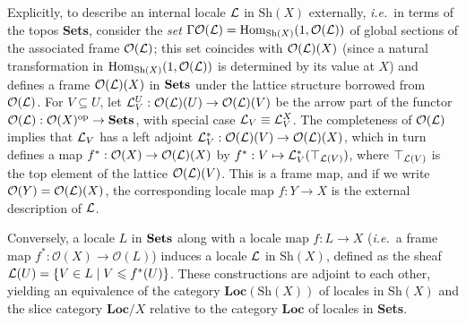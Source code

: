 \documentclass[12pt]{article}
\newcommand{\Sets}{\mbox{\textbf{Sets}}}
\newcommand{\raw}{\rightarrow} \newcommand{\rat}{\mapsto}
\newcommand{\CO}{{\mathcal O}} \newcommand{\CP}{{\mathcal P}}
\newcommand{\Sh}{\ensuremath{\mathrm{Sh}}}
\newcommand{\ie}{\textit{i.e.}}
\begin{document}
Explicitly,  to describe an internal locale ${\mathcal L}$ in $\Sh(X)$
externally, \ie\ in terms of the topos \Sets, consider the {\it set}
$\Gm\CO(\CL)=\mathrm{Hom}_{\Sh(X)}(1,\CO(\CL))$  of global sections of the
associated frame $\CO(\CL)$; this set coincides with $\CO(\CL)(X)$ 
(since a
natural transformation in $\mathrm{Hom}_{\Sh(X)}(1,\CO(\CL))$  is determined by its value at $X$)
and defines a frame $\CO(\CL)(X)$  in $\Sets$ under the lattice structure borrowed
from $\CO(\CL)$. For $V\subseteq U$, let $\CL^U_V:
\CO(\CL)(U)\raw \CO(\CL)(V)$ be the
arrow part of the functor $\CO(\CL):\CO(X)^{\mathrm{op}}\raw\Sets$, with
special case ${\mathcal L}_V\equiv{\mathcal L}^X_V$. The completeness of $\CO(\CL)$ implies
that ${\mathcal L}_V$ has a left adjoint $\CL^*_V:\CO(\CL)(V)\raw\CO(\CL)(X)$, which in
turn defines a map $f^*:\CO(X)\raw\CO(\CL)(X)$ by $f^*:V\mapsto
{\mathcal L}^*_V(\top_{{\mathcal L}(V)})$, where $\top_{{\mathcal L}(V)}$ is the top element of
the lattice $\CO(\CL)(V)$. This is a frame map, and if we write  $\CO(Y)=\CO(\CL)(X)$, the
corresponding locale
map $f: Y\raw X$  is the external description
of ${\mathcal L}$.

Conversely, a locale $L$ in $\Sets$ along with a
locale map $f:L\raw X$ (\ie\ a frame map $f^*:\CO(X)\raw \CO(L)$)
induces a locale ${\mathcal L}$ in $\Sh(X)$, defined as the sheaf
${\mathcal L}(U)=\{V\in L\mid V\leqslant f^*(U)\}$. These constructions are adjoint
to each other, yielding an equivalence of the category
$\mathbf{Loc}(\Sh(X))$ of locales in $\Sh(X)$ and the slice category
$\mathbf{Loc}/X$ relative to the category $\mathbf{Loc}$ of locales
in \Sets.
\end{document}
